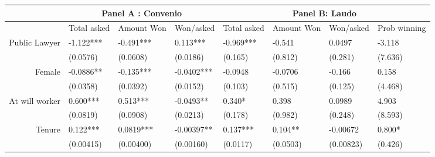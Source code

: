 \begin{tabular}{rrrrrrrr}
\toprule
      & \multicolumn{3}{c}{Panel A : Convenio} & \multicolumn{4}{c}{Panel B: Laudo} \\
\midrule
      & \multicolumn{1}{c}{Total asked} & \multicolumn{1}{c}{Amount Won} & \multicolumn{1}{c}{Won/asked} & \multicolumn{1}{c}{Total asked} & \multicolumn{1}{c}{Amount Won} & \multicolumn{1}{c}{Won/asked} & \multicolumn{1}{c}{Prob winning} \\
Public Lawyer & \multicolumn{1}{l}{-1.122***} & \multicolumn{1}{l}{-0.491***} & \multicolumn{1}{l}{0.113***} & \multicolumn{1}{l}{-0.969***} & \multicolumn{1}{l}{-0.541} & \multicolumn{1}{l}{0.0497} & \multicolumn{1}{l}{-3.118} \\
      & \multicolumn{1}{l}{(0.0576)} & \multicolumn{1}{l}{(0.0608)} & \multicolumn{1}{l}{(0.0186)} & \multicolumn{1}{l}{(0.165)} & \multicolumn{1}{l}{(0.812)} & \multicolumn{1}{l}{(0.281)} & \multicolumn{1}{l}{(7.636)} \\
Female & \multicolumn{1}{l}{-0.0886**} & \multicolumn{1}{l}{-0.135***} & \multicolumn{1}{l}{-0.0402***} & \multicolumn{1}{l}{-0.0948} & \multicolumn{1}{l}{-0.0706} & \multicolumn{1}{l}{-0.166} & \multicolumn{1}{l}{0.158} \\
      & \multicolumn{1}{l}{(0.0358)} & \multicolumn{1}{l}{(0.0392)} & \multicolumn{1}{l}{(0.0152)} & \multicolumn{1}{l}{(0.103)} & \multicolumn{1}{l}{(0.515)} & \multicolumn{1}{l}{(0.125)} & \multicolumn{1}{l}{(4.468)} \\
At will worker & \multicolumn{1}{l}{0.600***} & \multicolumn{1}{l}{0.513***} & \multicolumn{1}{l}{-0.0493**} & \multicolumn{1}{l}{0.340*} & \multicolumn{1}{l}{0.398} & \multicolumn{1}{l}{0.0989} & \multicolumn{1}{l}{4.903} \\
      & \multicolumn{1}{l}{(0.0819)} & \multicolumn{1}{l}{(0.0908)} & \multicolumn{1}{l}{(0.0213)} & \multicolumn{1}{l}{(0.178)} & \multicolumn{1}{l}{(0.982)} & \multicolumn{1}{l}{(0.248)} & \multicolumn{1}{l}{(8.593)} \\
Tenure & \multicolumn{1}{l}{0.122***} & \multicolumn{1}{l}{0.0819***} & \multicolumn{1}{l}{-0.00397**} & \multicolumn{1}{l}{0.137***} & \multicolumn{1}{l}{0.104**} & \multicolumn{1}{l}{-0.00672} & \multicolumn{1}{l}{0.800*} \\
      & \multicolumn{1}{l}{(0.00415)} & \multicolumn{1}{l}{(0.00400)} & \multicolumn{1}{l}{(0.00160)} & \multicolumn{1}{l}{(0.0117)} & \multicolumn{1}{l}{(0.0503)} & \multicolumn{1}{l}{(0.00823)} & \multicolumn{1}{l}{(0.426)} \\

\end{tabular}
